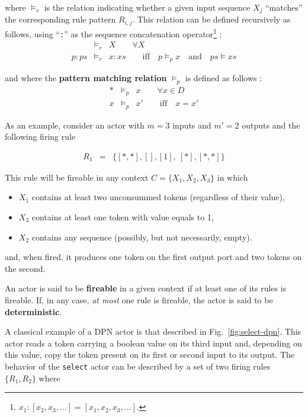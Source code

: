 where $\models_r$ is the relation indicating whether a given input
sequence $X_j$ ``matches'' the corresponding rule pattern $R_{i,j}$. This relation can be defined
recursively as follows, using ``\verb|:|'' as the sequence concatenation
operator\footnote{$x_1 : [x_2,x_3,\ldots] = [x_1,x_2,x_3,\ldots]$.} : 
\begin{eqnarray*}
    []  & \models_r & X  \qquad \forall X \\
    p:ps & \models_r & x:xs \qquad \text{iff}\quad p \models_p x \quad \text{and}\quad ps \models xs
\end{eqnarray*}

and where the \textbf{pattern matching relation} $\models_p$ is defined as follows :
\begin{eqnarray*}
* & \models_p & x \qquad \forall x \in D \\
x & \models_p & x' \qquad \text{iff}\quad x=x'
\end{eqnarray*}

\medskip
\noindent
As an example, consider an actor with $m=3$ inputs and $m'=2$ outputs and the following firing rule

\begin{eqnarray*}
    R_1 & = & \{ [*,*], [], [1],\ [*], [*,*] \}
\end{eqnarray*}

\noindent
This rule will be fireable in any context $C=\{X_1,X_2,X_3\}$ in which
\begin{itemize}
\item $X_1$ contains at least two unconsummed tokens (regardless of their value),
\item $X_3$ contains at least one token with value equals to 1,
\item $X_2$ contains any sequence (possibly, but not necessarily, empty).
\end{itemize}
\noindent
and, when fired, it produces one token on the first output port and two tokens on the second.

\medskip
\noindent
An actor is said to be \textbf{fireable} in a given context if at least one of its rules is
fireable. If, in any case, \emph{at most} one rule is fireable, the actor is said to be
\textbf{deterministic}.

\medskip
\noindent
A classical example of a DPN actor is that described in Fig.~\ref{fig:select-dpn}. This actor reads
a token carrying a boolean value on its third input and, depending on this value, copy the token
present on its first or second input to its output. The behavior of the \texttt{select} actor can be
described by a set of two firing rules $\{R_1, R_2\}$ where

